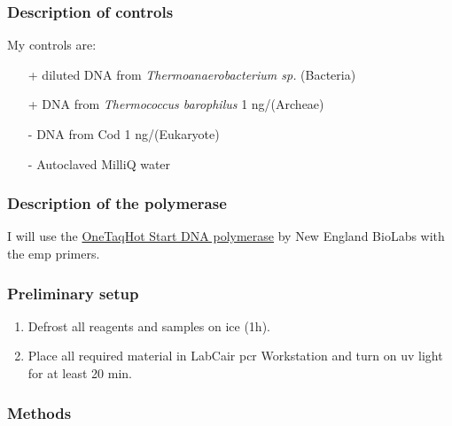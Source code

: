 \subsubsection{Description of controls}
My controls are:
\begin{itemize}
\item[+] diluted DNA from \textit{Thermoanaerobacterium sp.} (Bacteria)
\item[+] DNA from \textit{Thermococcus barophilus} 1 ng/\uL (Archeae)
\item[-] DNA from Cod 1 ng/\uL (Eukaryote)
\item[-] Autoclaved MilliQ water
\end{itemize}


\subsubsection{Description of the polymerase}

I will use the \href{https://www.neb.com/products/m0481-onetaq-hot-start-dna-polymerase#Product%20Information}{OneTaq\cR Hot Start DNA polymerase} by New England BioLabs with the \gls{emp} primers.

\subsubsection{Preliminary setup}

\begin{enumerate}
\item Defrost all reagents and samples on ice (1h). 
\item Place all required material in LabCair \gls{pcr} Workstation and turn on \gls{uv} light for at least 20 min.
\end{enumerate}

\subsubsection{Methods}

